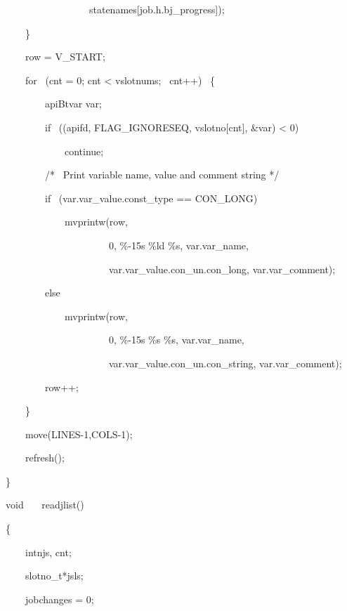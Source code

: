 \begin{exparasmall}
\ \ \ \ \ \ \ \ \ \ \ \ \ \ \ \ \ statenames[job.h.bj\_progress]);

\ \ \ \ \}

\bigskip


\ \ \ \ row = V\_START;

\bigskip


\ \ \ \ for \ (cnt = 0; cnt {\textless} vslotnums; \ cnt++) \ \{

\ \ \ \ \ \ \ \ apiBtvar var;

\ \ \ \ \ \ \ \ if \ (\funcnameXBvarread{}(apifd, \constprefix{}FLAG\_IGNORESEQ,
vslotno[cnt], \&var) {\textless} 0)

\ \ \ \ \ \ \ \ \ \ \ \ continue;

\bigskip


\ \ \ \ \ \ \ \ /* \ Print variable name, value and comment string */

\bigskip


\ \ \ \ \ \ \ \ if \ (var.var\_value.const\_type == CON\_LONG)

\ \ \ \ \ \ \ \ \ \ \ \ mvprintw(row,

\ \ \ \ \ \ \ \ \ \ \ \ \ \ \ \ \ \ \ \ \ 0, {\textquotedbl}\%-15s \%ld
\%s{\textquotedbl}, var.var\_name,

\ \ \ \ \ \ \ \ \ \ \ \ \ \ \ \ \ \ \ \ \ var.var\_value.con\_un.con\_long,
var.var\_comment);

\ \ \ \ \ \ \ \ else

\ \ \ \ \ \ \ \ \ \ \ \ mvprintw(row,

\ \ \ \ \ \ \ \ \ \ \ \ \ \ \ \ \ \ \ \ \ 0, {\textquotedbl}\%-15s \%s
\%s{\textquotedbl}, var.var\_name,

\ \ \ \ \ \ \ \ \ \ \ \ \ \ \ \ \ \ \ \ \ var.var\_value.con\_un.con\_string,
var.var\_comment);

\ \ \ \ \ \ \ \ row++;

\ \ \ \ \}

\bigskip


\ \ \ \ move(LINES-1,COLS-1);

\ \ \ \ refresh();

\}

\bigskip


void \ \ \ readjlist()

\{

\ \ \ \ intnjs, cnt;

\ \ \ \ slotno\_t*jsls;

\bigskip


\ \ \ \ jobchanges = 0;

\bigskip



\end{exparasmall}
